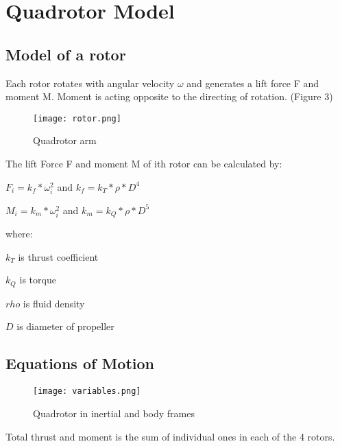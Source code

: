 \section{Quadrotor Model}



\subsection{Model of a rotor}

Each rotor rotates with angular velocity $\omega$ and generates a lift force F and moment M. Moment is acting opposite to the directing of rotation. (Figure 3)

\begin{figure}[H]
    \centering
    \texttt{[image: rotor.png]}
    \caption{Quadrotor arm}
    \label{fig:enter-label}
\end{figure}

The lift Force F and moment M of ith rotor can be calculated by:

$F_i = k_f * \omega_i^2$ \hspace{1cm} and \hspace{2cm} $k_f = k_T*\rho * D^4$

$M_i = k_m * \omega_i^2$ \hspace{1cm} and \hspace{1.8cm} $k_m = k_Q*\rho * D^5$

\vspace{10pt}
where:

$k_T$ is thrust coefficient

$k_Q$ is torque 

$rho$ is fluid density

$D$ is diameter of propeller
\\

\subsection{Equations of Motion}

\begin{figure}[H]
    \centering
    \texttt{[image: variables.png]}
    \caption{Quadrotor in inertial and body frames}
    \label{fig:enter-label}
\end{figure}

Total thrust and moment is the sum of individual ones in each of the 4 rotors.
\vspace{10pt}

